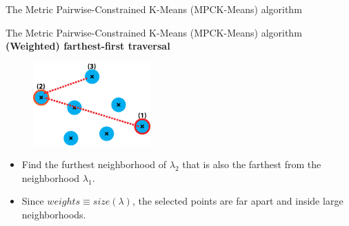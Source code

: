 \documentclass{beamer}
\newlength{\tmpShadow}
\newcommand{\MyShadow}[2]{%
	\settowidth{\tmpShadow}{#1}
	\addtolength{\tmpShadow}{.1em}
	\raisebox{-0.25ex}{\textcolor{gray!70}{#1}}%
	\kern-\tmpShadow%
	\textcolor{#2}{#1}%
}
\begin{document}
{\begin{frame}{The Metric Pairwise-Constrained K-Means (MPCK-Means) algorithm}
\end{frame}	
\begin{frame}{The Metric Pairwise-Constrained K-Means (MPCK-Means) algorithm}
	\textbf{(Weighted) farthest-first traversal}\\
	\vspace{4mm}
	\begin{figure}[H]
		\centering
		\includegraphics[width=0.4\textwidth]{figures/farthest_2nd}
	\end{figure}
	\vspace{2mm}
	\begin{itemize}[label={\MyShadow{$\bullet$}{blue!80}}]
		\item<1-> Find the furthest neighborhood of $\lambda_2$ that is also the farthest from the neighborhood $\lambda_1$.	
		\vspace{3mm}
		\item<2-> Since $weights \equiv size(\lambda)$, the selected points are far apart and inside large neighborhoods.
	\end{itemize}	
	\vspace{24mm}
\end{frame}	


}
\end{document}
